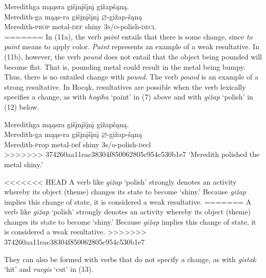 \documentclass[output=paper]{LSP/langsci}
\begin{document}
\begin{exe}
\begin{exe}

\ex \glll Meredithga mąąsra gišįnįšįnį gižapšąną.  \\
 Meredith-ga mąąs-ra gišįnįšįnį {$\varnothing$}-gižap-šąną\\
 Meredith-\textsc{prop} metal-\textsc{def} shiny \textsc{3s/o}-polish-\textsc{decl}\\
=======
In (11a), the verb \textit{paint} entails that there is some change, since \textit{to paint} means to apply color. \textit{Paint} represents an example of a weak resultative. In (11b), however, the verb \textit{pound} does not entail that the object being pounded will become flat. That is, pounding metal could result in the metal being bumpy. Thus, there is no entailed change with \textit{pound}. The verb \textit{pound} is an example of a strong resultative. In Hoc\k{a}k, resultatives are possible when the verb lexically specifies a change, as with \textit{hogiha} `paint' in (7) above and with \textit{gi\v{z}ap} `polish' in (12) below.

\begin{exe}

\ex \glll Meredithga m\k{a}\k{a}sra gi\v{s}\k{i}n\k{i}\v{s}\k{i}n\k{i} gi\v{z}ap\v{s}\k{a}n\k{a}.  \\
 Meredith-ga m\k{a}\k{a}s-ra gi\v{s}\k{i}n\k{i}\v{s}\k{i}n\k{i} $\varnothing$-gi\v{z}ap-\v{s}\k{a}n\k{a}\\
 Meredith-{\textsc prop} metal-{\textsc def} shiny {\textsc 3s/o}-polish-{\textsc decl}\\
>>>>>>> 374260aa11eac38304f850062805c954c530b1e7
\glt `Meredith polished the metal shiny.'

\end{exe}

<<<<<<< HEAD
A verb like \textit{gižap} `polish' strongly denotes an activity whereby its object (theme) changes its state to become `shiny.' Because \textit{gižap} implies this change of state, it is considered a weak resultative. 
=======
A verb like \textit{gi\v{z}ap} `polish' strongly denotes an activity whereby its object (theme) changes its state to become `shiny.' Because \textit{gi\v{z}ap} implies this change of state, it is considered a weak resultative. 
>>>>>>> 374260aa11eac38304f850062805c954c530b1e7

They can also be formed with verbs that do not specify a change, as with \textit{gistak} `hit' and \textit{rucgis} `cut' in (13).

\begin{exe}
\ex
\begin{xlist}


\end{xlist}
\end{exe}
\end{exe}
\end{exe}
\end{document}
